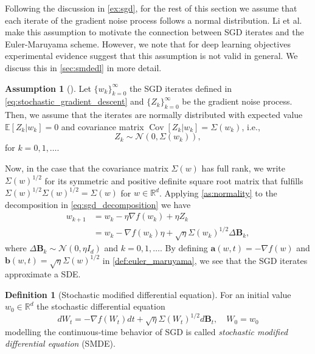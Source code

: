 \documentclass[12pt]{article}
\theoremstyle{definition}
\newtheorem{definition}[definition]{Definition}
\newtheorem{assumption}[assumption]{Assumption}
\numberwithin{equation}{section}
\newcommand{\R}{\mathbb{R}}
\newcommand{\CN}{\mathcal{N}}
\newcommand{\ev}[1]{\mathbb{E}\left[{#1}\right]}
\DeclareMathOperator{\Cov}{Cov}
\begin{document}
Following the discussion in \autoref{ex:sgd}, for the rest of this section we assume that each iterate of the gradient noise process follows a normal distribution. Li et al.\ \cite{liStochasticModifiedEquations2019} make this assumption to motivate the connection between SGD iterates and the Euler-Maruyama scheme. However, we note that for deep learning objectives experimental evidence suggest that this assumption is not valid in general. We discuss this in \autoref{sec:smdedl} in more detail.
\begin{assumption}[]
  \label{as:normality}
  Let $\{w_k\}_{k=0}^\infty$ the SGD iterates defined in \eqref{eq:stochastic_gradient_descent} and $\{Z_k\}_{k=0}^\infty$ be the gradient noise process. Then, we assume that the iterates are normally distributed with expected value $\ev{Z_k|w_k} = 0$ and covariance matrix $\Cov \left[Z_k | w_k\right] = \Sigma(w_k)$, i.e.,
  \begin{equation*}
    Z_k \sim \CN(0, \Sigma(w_k)),
  \end{equation*}
for $k=0,1,\dots$.  
\end{assumption}
Now, in the case that the covariance matrix $\Sigma(w)$ has full rank, we write $\Sigma(w)^{1/2}$ for its symmetric and positive definite square root matrix that fulfills $\Sigma(w)^{1/2}\Sigma(w)^{1/2} = \Sigma(w)$ for $w\in \R^d$. Applying \autoref{as:normality} to the decomposition in \eqref{eq:sgd_decomposition} we have
\begin{equation}
  \label{eq:sgd_normal_decomposition}
  \begin{split}
    w_{k+1} &= w_{k} - \eta \nabla f(w_{k}) + \eta Z_k \\
  &= w_k - \nabla f(w_k) \eta + \sqrt{\eta}\Sigma(w_k)^{1/2}\Delta \mathbf{B}_k,
  \end{split}
\end{equation}
where $\Delta \mathbf{B}_k \sim \CN(0,\eta I_d)$ and $k=0,1,\dots$. 
By defining $\mathbf{a}(w,t) = -\nabla f(w)$ and $\mathbf{b}(w,t) = \sqrt{\eta}\Sigma(w)^{1/2}$ in \autoref{def:euler_maruyama}, we see that the SGD iterates approximate a SDE. 
\begin{definition}[Stochastic modified differential equation]
  For an initial value $w_0 \in \R^d$ the stochastic differential equation
  \begin{equation}
    \label{eq:first_oder_smde}
    dW_t = -\nabla f(W_t)dt + \sqrt{\eta} \Sigma(W_t)^{1/2}d\mathbf{B}_t, \quad W_0 = w_0
  \end{equation}
  modelling the continuous-time behavior of SGD is called \emph{stochastic modified differential equation} (SMDE).
\end{definition}
\end{document}
